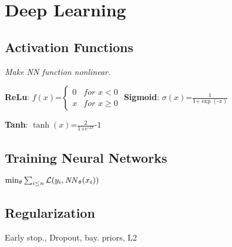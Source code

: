 \section{Deep Learning}
\subsection{Activation Functions}
\textit{Make NN function non\text{-}linear.}

\textbf{ReLu}: 
$
	f(x) \text{=} \begin{cases}
		0 &\textit{for }x<0 \\
		x &\textit{for } x\geq 0
	\end{cases}
$
\textbf{Sigmoid}: 
$
	\sigma(x) \text{=} \frac{1}{1 \text{+} \exp(\text{-}x)}
$

	\textbf{Tanh}: 
$
	\tanh(x) \text{=} \frac{2}{1 \text{+} e^{\text{-}2x}}\text{-}1
$

\subsection{Training Neural Networks}
$	\min_\theta \sum_{i\leq n} \mathcal L(y_i, \mathit{NN}_\theta(x_i))
$

\subsection{Regularization}
Early stop., Dropout, bay. priors, L2
